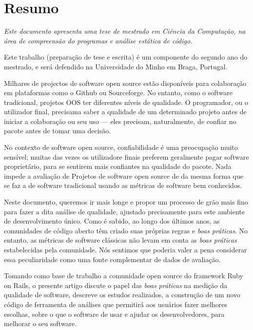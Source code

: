 \thispagestyle{plain}
\chapter*{Resumo}\label{chap:resumo}


{\it
  Este documento apresenta uma tese de mestrado em Ciência da Computação, 
  na área de \textit{compreensão do programas e análise estática de código}.

  Este trabalho (preparação de tese e escrita) é um componente do segundo ano do mestrado,
  e será defendido na Universidade do Minho em Braga, Portugal.

  Milhares de projectos de software open source estão disponíveis para colaboração 
  em plataformas como o Github ou Sourceforge.
  No entanto, como o software tradicional, projetos OOS ter diferentes níveis de qualidade.
  O programador, ou o utilizador final, precisama saber a qualidade de um determinado projeto antes de iniciar a colaboração
  ou seu uso --- eles precisam, naturalmente, de confiar no pacote antes de tomar uma decisão.
  
  No contexto de software open source, confiabilidade é uma preocupação muito  sensível; 
  muitas das vezes os utilizadore finais preferem geralmente pagar
  software proprietário, para se sentirem mais confiantes na qualidade do pacote.
  Nada impede a avaliação de Projetos de software open source de da mesma forma que se faz a de 
  software tradicional usando as métricas de software bem conhecidos.
  
  Neste documento, queremos ir mais longe e propor um processo de grão mais fino para fazer a dita análise de qualidade,
  ajustado precisamente para este ambiente de desenvolvimento único.
  Como é sabido, ao longo dos últimos anos, as comunidades de código aberto têm criado suas próprias regras e \emph{boas práticas}.
  No entanto, as métricas de software clássicas não levam em conta as \emph{boas práticas}
  estabelecidas pela comunidade.
  Nós sentimos que poderia valer a pena considerar essa peculiaridade como uma fonte complementar de dados de avaliação.
  
  Tomando como base de trabalho a comunidade open source do framework Ruby on Rails,
  o presente artigo discute o papel das
  \emph{boas práticas} na medição da qualidade de software, descreve os estudos realizados, 
  a construção de um novo código de ferramenta de análises que
  permitirá aos usuários fazer melhores escolhas, sobre o que o software de usar e ajudar os desenvolvedores, 
  para melhorar o seu software.
}
